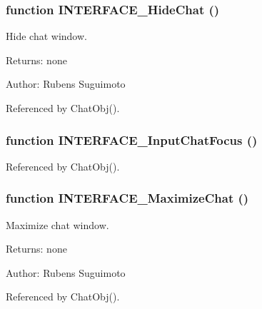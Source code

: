 \subsubsection[INTERFACE\_\-HideChat]{\setlength{\rightskip}{0pt plus 5cm}function INTERFACE\_\-HideChat ()}\label{interface_2chat_8js_2429ebdcc52373f547c0d52d29144c7c}


Hide chat window. 

\begin{Desc}
\item[Returns:]none \end{Desc}
\begin{Desc}
\item[Author:]Rubens Suguimoto \end{Desc}


Referenced by ChatObj().
\subsubsection[INTERFACE\_\-InputChatFocus]{\setlength{\rightskip}{0pt plus 5cm}function INTERFACE\_\-InputChatFocus ()}\label{interface_2chat_8js_7b51722ce4a2152c30bdc38c4f163f1b}




Referenced by ChatObj().
\subsubsection[INTERFACE\_\-MaximizeChat]{\setlength{\rightskip}{0pt plus 5cm}function INTERFACE\_\-MaximizeChat ()}\label{interface_2chat_8js_8121900955a75e290fec5e16fa319541}


Maximize chat window. 

\begin{Desc}
\item[Returns:]none \end{Desc}
\begin{Desc}
\item[Author:]Rubens Suguimoto \end{Desc}


Referenced by ChatObj().
